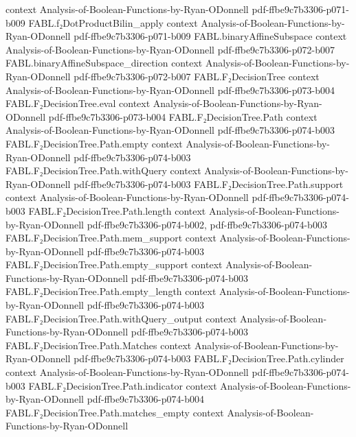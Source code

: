 \begin{theorem}
  {context}
  {Analysis-of-Boolean-Functions-by-Ryan-ODonnell}
  {pdf-ffbe9c7b3306-p071-b009}
\proofstep
  {FABL.f₂DotProductBilin_apply}
  {context}
  {Analysis-of-Boolean-Functions-by-Ryan-ODonnell}
  {pdf-ffbe9c7b3306-p071-b009}
\proofstep
  {FABL.binaryAffineSubspace}
  {context}
  {Analysis-of-Boolean-Functions-by-Ryan-ODonnell}
  {pdf-ffbe9c7b3306-p072-b007}
\proofstep
  {FABL.binaryAffineSubspace_direction}
  {context}
  {Analysis-of-Boolean-Functions-by-Ryan-ODonnell}
  {pdf-ffbe9c7b3306-p072-b007}
\proofstep
  {FABL.F₂DecisionTree}
  {context}
  {Analysis-of-Boolean-Functions-by-Ryan-ODonnell}
  {pdf-ffbe9c7b3306-p073-b004}
\proofstep
  {FABL.F₂DecisionTree.eval}
  {context}
  {Analysis-of-Boolean-Functions-by-Ryan-ODonnell}
  {pdf-ffbe9c7b3306-p073-b004}
\proofstep
  {FABL.F₂DecisionTree.Path}
  {context}
  {Analysis-of-Boolean-Functions-by-Ryan-ODonnell}
  {pdf-ffbe9c7b3306-p074-b003}
\proofstep
  {FABL.F₂DecisionTree.Path.empty}
  {context}
  {Analysis-of-Boolean-Functions-by-Ryan-ODonnell}
  {pdf-ffbe9c7b3306-p074-b003}
\proofstep
  {FABL.F₂DecisionTree.Path.withQuery}
  {context}
  {Analysis-of-Boolean-Functions-by-Ryan-ODonnell}
  {pdf-ffbe9c7b3306-p074-b003}
\proofstep
  {FABL.F₂DecisionTree.Path.support}
  {context}
  {Analysis-of-Boolean-Functions-by-Ryan-ODonnell}
  {pdf-ffbe9c7b3306-p074-b003}
\proofstep
  {FABL.F₂DecisionTree.Path.length}
  {context}
  {Analysis-of-Boolean-Functions-by-Ryan-ODonnell}
  {pdf-ffbe9c7b3306-p074-b002,
    pdf-ffbe9c7b3306-p074-b003}
\proofstep
  {FABL.F₂DecisionTree.Path.mem_support}
  {context}
  {Analysis-of-Boolean-Functions-by-Ryan-ODonnell}
  {pdf-ffbe9c7b3306-p074-b003}
\proofstep
  {FABL.F₂DecisionTree.Path.empty_support}
  {context}
  {Analysis-of-Boolean-Functions-by-Ryan-ODonnell}
  {pdf-ffbe9c7b3306-p074-b003}
\proofstep
  {FABL.F₂DecisionTree.Path.empty_length}
  {context}
  {Analysis-of-Boolean-Functions-by-Ryan-ODonnell}
  {pdf-ffbe9c7b3306-p074-b003}
\proofstep
  {FABL.F₂DecisionTree.Path.withQuery_output}
  {context}
  {Analysis-of-Boolean-Functions-by-Ryan-ODonnell}
  {pdf-ffbe9c7b3306-p074-b003}
\proofstep
  {FABL.F₂DecisionTree.Path.Matches}
  {context}
  {Analysis-of-Boolean-Functions-by-Ryan-ODonnell}
  {pdf-ffbe9c7b3306-p074-b003}
\proofstep
  {FABL.F₂DecisionTree.Path.cylinder}
  {context}
  {Analysis-of-Boolean-Functions-by-Ryan-ODonnell}
  {pdf-ffbe9c7b3306-p074-b003}
\proofstep
  {FABL.F₂DecisionTree.Path.indicator}
  {context}
  {Analysis-of-Boolean-Functions-by-Ryan-ODonnell}
  {pdf-ffbe9c7b3306-p074-b004}
\proofstep
  {FABL.F₂DecisionTree.Path.matches_empty}
  {context}
  {Analysis-of-Boolean-Functions-by-Ryan-ODonnell}

\end{theorem}
